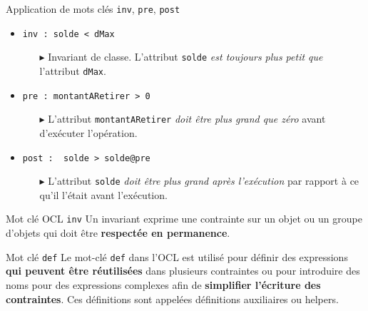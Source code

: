 \documentclass[16pt]{report}
\begin{document}
\begin{multicols*}{2}
         \begin{EExample}{Application de mots clés \texttt{inv}, \texttt{pre}, \texttt{post}      }{}
            \begin{itemize}
                \item \texttt{\textcolor{myb}{inv :} solde < dMax} 
                    \begin{itemize}
                        \item[$\blacktriangleright$] Invariant de classe. L'attribut \texttt{solde} \textit{est toujours plus petit que} l'attribut \texttt{dMax}.         
                    \end{itemize}
                \item \texttt{\textcolor{myb}{pre :} montantARetirer > 0}  
                    \begin{itemize} 
                        \item[$\blacktriangleright$]  L'attribut \texttt{montantARetirer} \textit{doit être plus grand que zéro} avant d'exécuter l'opération.     
                    \end{itemize}
                \item \texttt{\textcolor{myb}{post : } solde > solde@pre}
                    \begin{itemize} 
                    \item[$\blacktriangleright$] L'attribut \texttt{solde} \textit{doit être plus grand après l'exécution} par rapport à ce qu'il l'était avant l'exécution. 
                    \end{itemize}
           \end{itemize}
        \end{EExample}                    


        \begin{Definitionx}{Mot clé OCL \texttt{inv}  }{}
            Un invariant exprime une contrainte sur un objet ou un groupe d'objets qui doit être 
            \textbf{respectée en permanence}.   
        \end{Definitionx}


        \begin{Definitionx}{Mot clé \texttt{def}}{}
                Le mot-clé \texttt{def} dans l'OCL est utilisé pour définir des expressions 
                \textbf{qui peuvent être réutilisées} dans plusieurs contraintes ou pour introduire des noms pour des 
                expressions complexes afin de \textbf{simplifier l'écriture des contraintes}. 
                Ces définitions sont appelées définitions auxiliaires ou helpers.
        \end{Definitionx}



\end{multicols*}
\end{document}
